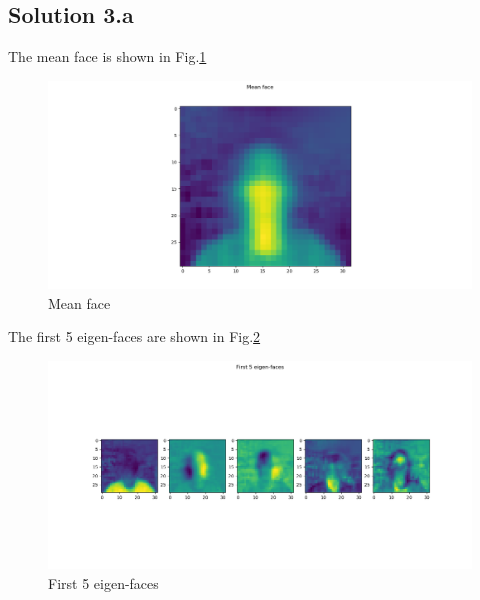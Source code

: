 \subsection*{Solution 3.a}
The mean face is shown in Fig.\ref{fig:mean_face}
\begin{figure}[h!]
	\centering
	\includegraphics[scale=0.5]{mean_face}
	\caption{Mean face}
	\label{fig:mean_face}
\end{figure}
The first 5 eigen-faces are shown in Fig.\ref{fig:eig_faces}
\newpage
\begin{figure}[h!]
	\centering
	\includegraphics[scale=0.5]{eig_faces}
	\caption{First 5 eigen-faces}
	\label{fig:eig_faces}
\end{figure}
